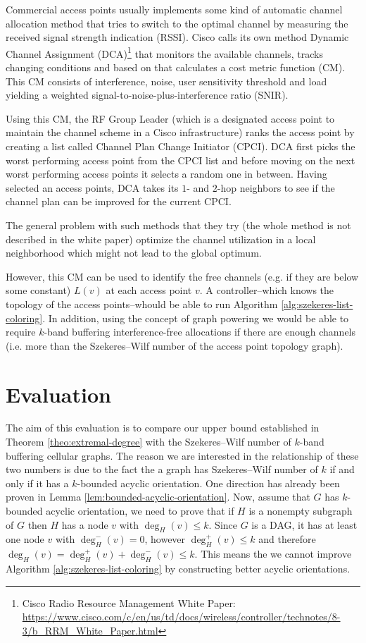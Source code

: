 \documentclass[a4paper, 12pt]{article}
\begin{document}
Commercial access points usually implements some kind of automatic channel allocation method that tries to switch to the optimal channel by measuring the received signal strength indication (RSSI). Cisco calls its own method Dynamic Channel Assignment (DCA)\footnote{Cisco Radio Resource Management White Paper: \url{https://www.cisco.com/c/en/us/td/docs/wireless/controller/technotes/8-3/b_RRM_White_Paper.html}} that monitors the available channels, tracks changing conditions and based on that calculates a cost metric function (CM). This CM consists of interference, noise, user sensitivity threshold and load yielding a weighted signal-to-noise-plus-interference ratio (SNIR).

Using this CM, the RF Group Leader (which is a designated access point to maintain the channel scheme in a Cisco infrastructure) ranks the access point by creating a list called Channel Plan Change Initiator (CPCI). DCA first picks the worst performing access point from the CPCI list and before moving on the next worst performing access points it selects a random one in between. Having selected an access points, DCA takes its $1$- and $2$-hop neighbors to see if the channel plan can be improved for the current CPCI.

The general problem with such methods that they try (the whole method is not described in the white paper) optimize the channel utilization in a local neighborhood which might not lead to the global optimum.

However, this CM can be used to identify the free channels (e.g. if they are below some constant) $L(v)$ at each access point $v$. A controller\---which knows the topology of the access points\---whould be able to run Algorithm \ref{alg:szekeres-list-coloring}. In addition, using the concept of graph powering we would be able to require $k$-band buffering interference-free allocations if there are enough channels (i.e. more than the Szekeres\---Wilf number of the access point topology graph).
\section{Evaluation}\label{sec:eval}
The aim of this evaluation is to compare our upper bound established in Theorem \ref{theo:extremal-degree} with the Szekeres\---Wilf number of $k$-band buffering cellular graphs. The reason we are interested in the relationship of these two numbers is due to the fact the a graph has Szekeres\---Wilf number of $k$ if and only if it has a $k$-bounded acyclic orientation. One direction has already been proven in Lemma \ref{lem:bounded-acyclic-orientation}. Now, assume that $G$ has $k$-bounded acyclic orientation, we need to prove that if $H$ is a nonempty subgraph of $G$ then $H$ has a node $v$ with $\deg_H(v) \leqslant k$. Since $G$ is a DAG, it has at least one node $v$ with $\deg_{H}^-(v)=0$, however $\deg_{H}^+(v) \leqslant k$ and therefore $\deg_H(v) = \deg_{H}^+(v) + \deg_{H}^-(v) \leqslant k$. This means the we cannot improve Algorithm \ref{alg:szekeres-list-coloring} by constructing better acyclic orientations.
\end{document}
